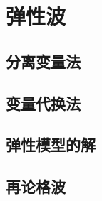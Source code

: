 

\section{弹性波}\label{8-3}

\subsection{分离变量法}\label{8-3-1}

\subsection{变量代换法}\label{8-3-2}

\subsection{弹性模型的解}\label{8-3-3}

\subsection{再论格波}\label{8-3-4}